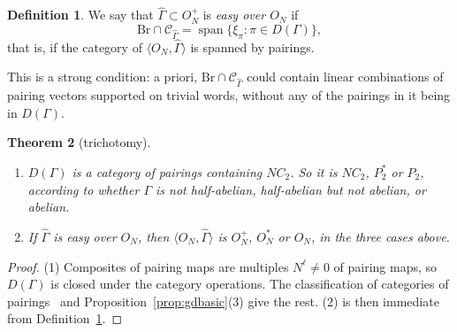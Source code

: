 \documentclass[11pt]{amsart}
\newtheorem{theorem}{Theorem}[section]
\theoremstyle{definition}
\newtheorem{definition}[theorem]{Definition}
\theoremstyle{remark}
\theoremstyle{plain}
\numberwithin{equation}{section}
\numberwithin{table}{section}
\newcommand{\Br}{\mathrm{Br}}
\DeclareMathOperator{\spn}{span}
\begin{document}
\begin{definition}\label{def:easygd}
We say that $\widehat\Gamma\subset O_N^+$ is \emph{easy over $O_N$} if
\[
\Br\cap\mathcal C_{\widehat\Gamma}=\spn\{\xi_\pi:\pi\in D(\Gamma)\},
\]
that is, if the category of $\langle O_N,\widehat\Gamma\rangle$ is spanned by pairings.
\end{definition}

This is a strong condition: a priori, $\Br\cap\mathcal C_{\widehat\Gamma}$ could contain linear combinations of pairing vectors supported on trivial words, without any of the pairings in it being in $D(\Gamma)$.

\begin{theorem}[trichotomy]\label{thm:gdtri}
\begin{enumerate}
\item $D(\Gamma)$ is a category of pairings containing $NC_2$. So it is $NC_2$, $P_2^*$ or $P_2$, according to whether $\Gamma$ is not half-abelian, half-abelian but not abelian, or abelian.
\item If $\widehat\Gamma$ is easy over $O_N$, then $\langle O_N,\widehat\Gamma\rangle$ is $O_N^+$, $O_N^*$ or $O_N$, in the three cases above.
\end{enumerate}
\end{theorem}

\begin{proof}
(1) Composites of pairing maps are multiples $N^{\ell}\ne0$ of pairing maps, so $D(\Gamma)$ is closed under the category operations. The classification of categories of pairings~\cite{bcs,bsp} and Proposition~\ref{prop:gdbasic}(3) give the rest. (2) is then immediate from Definition~\ref{def:easygd}.
\end{proof}
\end{document}
